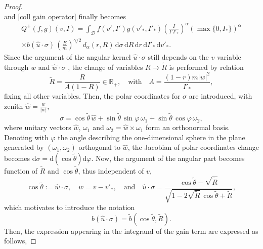 \documentclass[11pt,a4paper]{amsart}
\newcommand{\md}{\mathrm{d}}
\newcommand{\dpo}{d_\alpha(r,R)}
\newcommand{\g}{\gamma}
\newcommand{\D}{\mathcal{D}}
\newcommand{\E}{\left(\frac{E}{m}\right)}
\newcommand{\A}{A}
\newcommand{\B}{B}
\begin{document}
\begin{proof}
\begin{equation}
\end{equation}
and \eqref{coll gain operator} finally becomes
	\begin{multline}\label{coll gain operator new}
	Q^+(f,g)(v,I) =\int_\D  f(v',I')g(v'_*,I'_*) \left(\frac{I }{I' I'_* }\right)^{\alpha}  (\max\{0,I_*\})^\alpha \\ \times b(\hat{u}\cdot\sigma) \, \E^{\g/2} \, \dpo  \, \md \sigma \, \md  {R} \, \md r \, \md I'_* \, \md v'_*.
\end{multline}
Since the argument of the angular kernel $\hat{u}\cdot\sigma $ still depends on the $v$ variable through $w$ and  $\hat{w}\cdot\sigma$ , the   change of variables $R\mapsto \tilde{R}$ is performed  by relation
\begin{equation}\label{bL1 R tilde change}
	\tilde{R} = \frac{R}{\A (1-R)} \in \mathbb{R}_+,  \quad \text{with}
	\quad \A = \frac{(1-r)m|w|^2}{I'_*},
\end{equation} 
fixing all other variables. Then, the   polar coordinates for $\sigma$ are introduced, with zenith $\hat{w}=\tfrac{w}{|w|}$,  
\begin{equation}\label{sigma polar}
	\sigma = \cos \tilde{\theta} \, \hat{w} + \sin\tilde{\theta} \, \sin\varphi \, \omega_1 +  \sin\tilde{\theta} \, \cos\varphi \, \omega_2, 
\end{equation}
where unitary vectors $\hat{w}$, $\omega_1$ and $\omega_2=\hat{w}\times \omega_1$ form an orthonormal basis. Denoting with $\varphi$ the angle describing the one-dimensional sphere in the plane generated by $(\omega_1,\omega_2)$ orthogonal to $\hat{w}$, the Jacobian of polar coordinates change becomes $\md \sigma = 	\md (\cos\tilde{\theta}) \md \varphi$. Now, the argument of the angular part becomes function of $	\tilde{R}$ and $\cos\tilde{\theta}$,  thus independent of $v$, 
\begin{equation}\label{restr theta tilde}
	\cos \tilde{\theta}  := \hat{w}\cdot\sigma, \quad w = v-v'_*, \quad \text{and} \quad  \hat{u}\cdot\sigma = \frac{\cos\tilde{\theta}-\sqrt{\tilde{R}}}{\sqrt{1-2 \sqrt{\tilde{R}} \, \cos\tilde{\theta} + \tilde{R} } },
\end{equation}
which
 motivates to introduce the notation
\begin{equation}\label{b new}
	b(\hat{u}\cdot\sigma) = \tilde{b}(\cos\tilde{\theta},\tilde{R}).
\end{equation}
Then,  the expression appearing in the integrand of the gain term are expressed as follows,

\end{proof}
\end{document}
